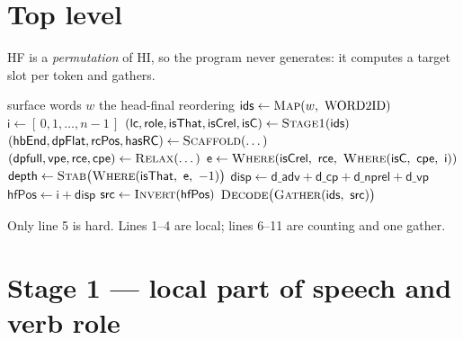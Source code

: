\documentclass[11pt]{article}
\newcommand{\sop}[1]{\ensuremath{\mathsf{#1}}}
\begin{document}
\section{Top level}

HF is a \emph{permutation} of HI, so the program never generates: it computes a target slot per
token and gathers.

\begin{algorithm}[H]
\caption{\textsc{HiToHf}$(w[0..n{-}1])$ --- head-initial $\to$ head-final}
\begin{algorithmic}[1]
\Require surface words $w$
\Ensure the head-final reordering
\State $\sop{ids} \gets \textsc{Map}(w,\ \text{WORD2ID})$ 
\State $\sop{i} \gets [\,0,1,\dots,n-1\,]$ 
\State $(\sop{lc},\sop{role},\sop{isThat},\sop{isCrel},\sop{isC}) \gets \textsc{Stage1}(\sop{ids})$ 
\State $(\sop{hbEnd},\sop{dpFlat},\sop{rcPos},\sop{hasRC}) \gets \textsc{Scaffold}(\dots)$ 
\State $(\sop{dpfull},\sop{vpe},\sop{rce},\sop{cpe}) \gets \textsc{Relax}(\dots)$ 
\State $\sop{e} \gets \textsc{Where}(\sop{isCrel},\ \sop{rce},\ \textsc{Where}(\sop{isC},\ \sop{cpe},\ \sop{i}))$ 
\State $\sop{depth} \gets \textsc{Stab}\big(\textsc{Where}(\sop{isThat},\ \sop{e},\ -1)\big)$ 
\State $\sop{disp} \gets \sop{d\_adv}+\sop{d\_cp}+\sop{d\_nprel}+\sop{d\_vp}$ 
\State $\sop{hfPos} \gets \sop{i} + \sop{disp}$ 
\State $\sop{src} \gets \textsc{Invert}(\sop{hfPos})$ 
\State \Return $\textsc{Decode}\big(\textsc{Gather}(\sop{ids},\ \sop{src})\big)$
\end{algorithmic}
\end{algorithm}

\noindent Only line 5 is hard. Lines 1--4 are local; lines 6--11 are counting and one gather.

\section{Stage 1 --- local part of speech and verb role}
\end{document}
